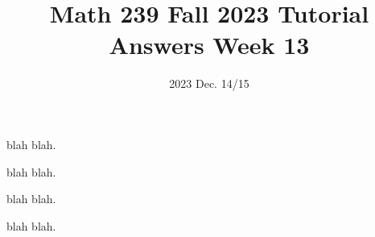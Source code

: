 \title{Math 239 Fall 2023 Tutorial Answers Week 13}

\date{2023 Dec. 14/15}
\maketitle

\begin{enumerate}
     blah blah.

    \newpage
     blah blah.

    \newpage
     blah blah.

    \newpage
     blah blah.
\end{enumerate}